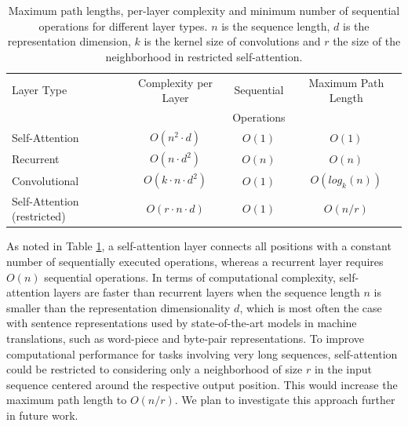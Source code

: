 \documentclass{article}
\begin{document}
\begin{table}[t]
\caption{
  Maximum path lengths, per-layer complexity and minimum number of sequential operations for different layer types. $n$ is the sequence length, $d$ is the representation dimension, $k$ is the kernel size of convolutions and $r$ the size of the neighborhood in restricted self-attention.}
\label{tab:op_complexities}
\begin{center}
\vspace{-1mm}


\begin{tabular}{lccc}
\toprule
Layer Type & Complexity per Layer & Sequential & Maximum Path Length  \\
           &             & Operations &   \\
\hline
\rule{0pt}{2.0ex}Self-Attention & $O(n^2 \cdot d)$ & $O(1)$ & $O(1)$ \\
Recurrent & $O(n \cdot d^2)$ & $O(n)$ & $O(n)$ \\

Convolutional & $O(k \cdot n \cdot d^2)$ & $O(1)$ & $O(log_k(n))$ \\
Self-Attention (restricted)& $O(r \cdot n \cdot d)$ & $O(1)$ & $O(n/r)$ \\









\bottomrule
\end{tabular}
\end{center}
\end{table}
















As noted in Table \ref{tab:op_complexities}, a self-attention layer connects all positions with a constant number of sequentially executed operations, whereas a recurrent layer requires $O(n)$ sequential operations.
In terms of computational complexity, self-attention layers are faster than recurrent layers when the sequence length $n$ is smaller than the representation dimensionality $d$, which is most often the case with sentence representations used by state-of-the-art models in machine translations, such as word-piece \citep{wu2016google} and byte-pair \citep{sennrich2015neural} representations.
To improve computational performance for tasks involving very long sequences, self-attention could be restricted to considering only a neighborhood of size $r$ in the input sequence centered around the respective output position. This would increase the maximum path length to $O(n/r)$. We plan to investigate this approach further in future work.
\end{document}
